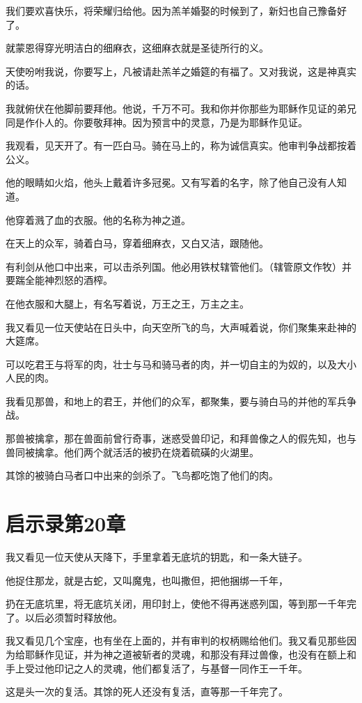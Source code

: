 \documentclass[12pt,oneside]{book}
\begin{document}
我们要欢喜快乐，将荣耀归给他。因为羔羊婚娶的时候到了，新妇也自己豫备好了。

就蒙恩得穿光明洁白的细麻衣，这细麻衣就是圣徒所行的义。

天使吩咐我说，你要写上，凡被请赴羔羊之婚筵的有福了。又对我说，这是神真实的话。

我就俯伏在他脚前要拜他。他说，千万不可。我和你并你那些为耶稣作见证的弟兄同是作仆人的。你要敬拜神。因为预言中的灵意，乃是为耶稣作见证。

我观看，见天开了。有一匹白马。骑在马上的，称为诚信真实。他审判争战都按着公义。

他的眼睛如火焰，他头上戴着许多冠冕。又有写着的名字，除了他自己没有人知道。

他穿着溅了血的衣服。他的名称为神之道。

在天上的众军，骑着白马，穿着细麻衣，又白又洁，跟随他。

有利剑从他口中出来，可以击杀列国。他必用铁杖辖管他们。（辖管原文作牧）并要踹全能神烈怒的酒榨。

在他衣服和大腿上，有名写着说，万王之王，万主之主。

我又看见一位天使站在日头中，向天空所飞的鸟，大声喊着说，你们聚集来赴神的大筵席。

可以吃君王与将军的肉，壮士与马和骑马者的肉，并一切自主的为奴的，以及大小人民的肉。

我看见那兽，和地上的君王，并他们的众军，都聚集，要与骑白马的并他的军兵争战。

那兽被擒拿，那在兽面前曾行奇事，迷惑受兽印记，和拜兽像之人的假先知，也与兽同被擒拿。他们两个就活活的被扔在烧着硫磺的火湖里。

其馀的被骑白马者口中出来的剑杀了。飞鸟都吃饱了他们的肉。

\chapter{启示录第20章}
我又看见一位天使从天降下，手里拿着无底坑的钥匙，和一条大链子。

他捉住那龙，就是古蛇，又叫魔鬼，也叫撒但，把他捆绑一千年，

扔在无底坑里，将无底坑关闭，用印封上，使他不得再迷惑列国，等到那一千年完了。以后必须暂时释放他。

我又看见几个宝座，也有坐在上面的，并有审判的权柄赐给他们。我又看见那些因为给耶稣作见证，并为神之道被斩者的灵魂，和那没有拜过兽像，也没有在额上和手上受过他印记之人的灵魂，他们都复活了，与基督一同作王一千年。

这是头一次的复活。其馀的死人还没有复活，直等那一千年完了。
\end{document}
